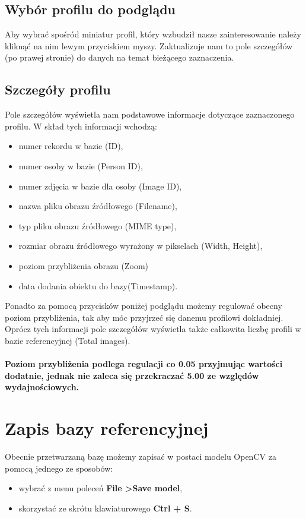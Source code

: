 \documentclass[]{article}
\begin{document}
\subsection{Wybór profilu do podglądu}
Aby wybrać spośród miniatur profil, który wzbudził nasze zainteresowanie należy kliknąć na nim lewym przyciskiem myszy. Zaktualizuje nam to pole szczegółów (po prawej stronie) do danych na temat bieżącego zaznaczenia.

\subsection{Szczegóły profilu}
Pole szczegółów wyświetla nam podstawowe informacje dotyczące zaznaczonego profilu. W skład tych informacji wchodzą:
\begin{itemize}
	\item numer rekordu w bazie (ID),
	\item numer osoby w bazie (Person ID),
	\item numer zdjęcia w bazie dla osoby (Image ID),
	\item nazwa pliku obrazu źródłowego (Filename),
	\item typ pliku obrazu źródłowego (MIME type),
	\item rozmiar obrazu źródłowego wyrażony w pikselach (Width, Height),
	\item poziom przybliżenia obrazu (Zoom)
	\item data dodania obiektu do bazy(Timestamp).
\end{itemize}
Ponadto za pomocą przycisków poniżej podglądu możemy regulować obecny poziom przybliżenia, tak aby móc przyjrzeć się danemu profilowi dokładniej.
\newline
Oprócz tych informacji pole szczegółów wyświetla także całkowita liczbę profili w bazie referencyjnej (Total images).
\paragraph*{Poziom przybliżenia podlega regulacji co 0.05 przyjmując wartości dodatnie, jednak nie zaleca się przekraczać 5.00 ze względów wydajnościowych.}

\section[Zapisywanie bazy]{Zapis bazy referencyjnej}
\label{sec:save}
Obecnie przetwarzaną bazę możemy zapisać w postaci modelu OpenCV za pomocą jednego ze sposobów:
\begin{itemize}
	\item wybrać z menu poleceń \textbf{File \textgreater \space Save model},
	\item skorzystać ze skrótu klawiaturowego \textbf{Ctrl + S}.
\end{itemize}
\end{document}
